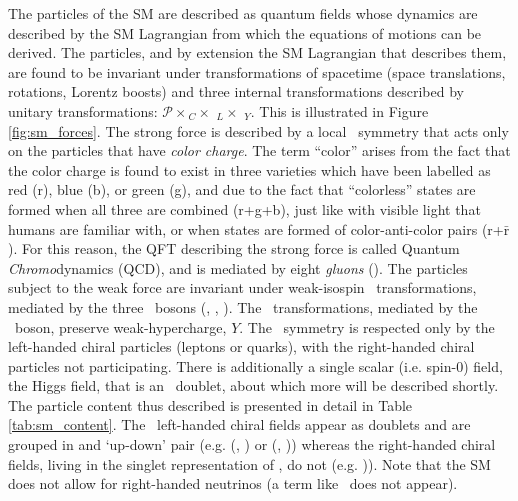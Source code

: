 The particles of the SM are described as quantum fields whose dynamics are
described by the SM Lagrangian from which the equations of motions can be derived.
The particles, and by extension the SM Lagrangian that describes them, are found to be invariant under transformations of spacetime 
(space translations, rotations, Lorentz boosts) and three internal transformations described by unitary transformations: $\mathcal{P} \times$\SUthree$_C \times $ \SUtwo$_L \times$ \Uone$_{Y}$.
This is illustrated in Figure \ref{fig:sm_forces}. The strong force is described by a
local \SUthree~symmetry that acts only on the particles that have \textit{color charge}.
The term ``color'' arises from the fact that the color charge is found to exist
in three varieties which have been labelled as red (r), blue (b), or green (g), and due
to the fact that ``colorless'' states are formed when all three are combined (r+g+b), just
like with visible light that humans are familiar with, or when states are formed of color-anti-color
pairs (r+$\bar{\text{r}}$). For this reason, the QFT describing the strong force is called
Quantum \textit{Chromo}dynamics (QCD), and is mediated by eight \textit{gluons} (\fieldG).
The particles subject to the weak force are invariant under weak-isospin \SUtwo~transformations,
mediated by the three  \fieldW~bosons (\fieldWone, \fieldWtwo, \fieldWthree).
The \Uone~transformations, mediated by the \fieldB~boson, preserve weak-hypercharge, $Y$.
The \SUtwo~symmetry is respected only by the left-handed chiral
particles (leptons or quarks), with the right-handed chiral particles not participating.
There is additionally a single scalar (i.e. spin-0) field, the Higgs field, that is an \SUtwo~doublet, about which more will be described shortly.
The particle content thus described is presented in detail in Table \ref{tab:sm_content}.
The \SUtwo~left-handed chiral fields appear as doublets and are grouped in
and `up-down' pair (e.g. (\fieldUl, \fieldDl) or (\fieldEl, \fieldNuEl)) whereas the right-handed chiral fields,
living in the singlet representation of \SUtwo, do not (e.g. \fieldUr)). Note
that the SM does not allow for right-handed neutrinos (a term like \fieldNuR~does not appear).

